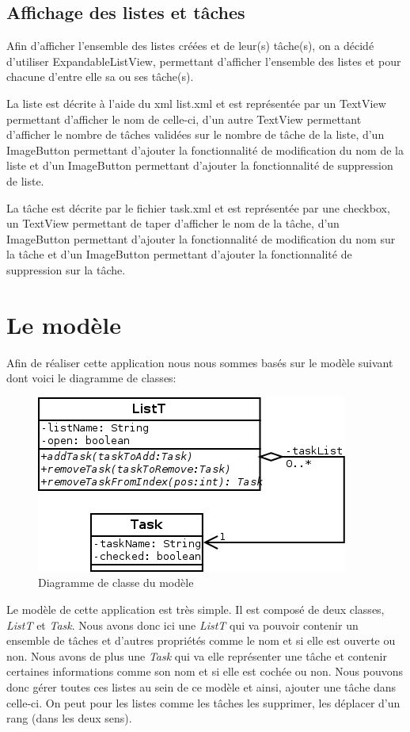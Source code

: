 \documentclass[a4paper,10pt]{article}
\begin{document}
\subsection{Affichage des listes et tâches}
Afin d'afficher l'ensemble des listes créées et de leur(s) tâche(s), on a décidé d'utiliser ExpandableListView, permettant d'afficher l'ensemble des listes et pour chacune d'entre elle sa ou ses tâche(s).

La liste est décrite à l'aide du xml list.xml et est représentée par un TextView permettant d'afficher le nom de celle-ci, d'un autre TextView permettant d'afficher le nombre de tâches validées sur le nombre de tâche de la liste, d'un ImageButton permettant d'ajouter la fonctionnalité de modification du nom de la liste et d'un ImageButton permettant d'ajouter la fonctionnalité de suppression de liste.

La tâche est décrite par le fichier task.xml et est représentée par une checkbox, un TextView permettant de taper d'afficher le nom de la tâche, d'un ImageButton permettant d'ajouter la fonctionnalité de modification du nom sur la tâche et d'un ImageButton permettant d'ajouter la fonctionnalité de suppression sur la tâche.

\newpage
\section{Le modèle}
Afin de réaliser cette application nous nous sommes basés sur le modèle suivant dont voici le diagramme de classes:
\begin{figure}[htpb]
	\center
	\includegraphics[scale=0.5]{Images/dia_classe.png}
	\caption{Diagramme de classe du modèle}
\end{figure}

Le modèle de cette application est très simple. Il est composé de deux classes, \textit{ListT} et \textit{Task}.
Nous avons donc ici une \textit{ListT} qui va pouvoir contenir un ensemble de tâches et d'autres propriétés comme le nom et si elle est ouverte ou non. Nous avons de plus une \textit{Task} qui va elle représenter une tâche et contenir certaines informations comme son nom et si elle est cochée ou non.
Nous pouvons donc gérer toutes ces listes au sein de ce modèle et ainsi, ajouter une tâche dans celle-ci. On peut pour les listes comme les tâches les supprimer, les déplacer d'un rang (dans les deux sens).
\end{document}
